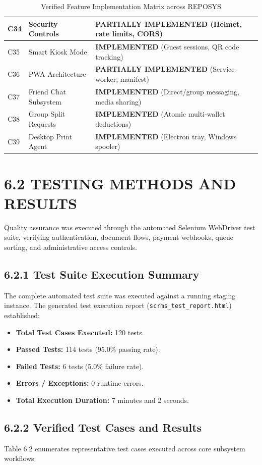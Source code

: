 \documentclass[12pt,a4paper,oneside]{report}
\begin{document}
\begin{table}[H]
\begin{tabularx}{\textwidth}{|p{0.55in}|p{1.9in}|X|}
C34 & Security Controls & \textbf{PARTIALLY IMPLEMENTED} (Helmet, rate limits, CORS) \\ \hline
C35 & Smart Kiosk Mode & \textbf{IMPLEMENTED} (Guest sessions, QR code tracking) \\ \hline
C36 & PWA Architecture & \textbf{PARTIALLY IMPLEMENTED} (Service worker, manifest) \\ \hline
C37 & Friend Chat Subsystem & \textbf{IMPLEMENTED} (Direct/group messaging, media sharing) \\ \hline
C38 & Group Split Requests & \textbf{IMPLEMENTED} (Atomic multi-wallet deductions) \\ \hline
C39 & Desktop Print Agent & \textbf{IMPLEMENTED} (Electron tray, Windows spooler) \\ \hline
\end{tabularx}
\caption{Verified Feature Implementation Matrix across REPOSYS}
\label{tab:feature_matrix}
\end{table}

\section{6.2 TESTING METHODS AND RESULTS}
Quality assurance was executed through the automated Selenium WebDriver test suite, verifying authentication, document flows, payment webhooks, queue sorting, and administrative access controls.

\subsection{6.2.1 Test Suite Execution Summary}
The complete automated test suite was executed against a running staging instance. The generated test execution report (\texttt{scrms\_test\_report.html}) established:
\begin{itemize}[leftmargin=0.35in, itemsep=2pt]
  \item \textbf{Total Test Cases Executed:} 120 tests.
  \item \textbf{Passed Tests:} 114 tests (95.0\% passing rate).
  \item \textbf{Failed Tests:} 6 tests (5.0\% failure rate).
  \item \textbf{Errors / Exceptions:} 0 runtime errors.
  \item \textbf{Total Execution Duration:} 7 minutes and 2 seconds.
\end{itemize}

\subsection{6.2.2 Verified Test Cases and Results}
Table 6.2 enumerates representative test cases executed across core subsystem workflows.
\end{document}

